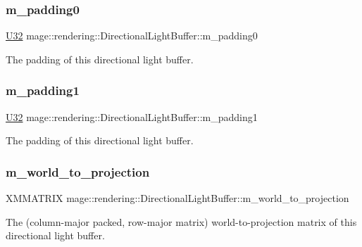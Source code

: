 \subsubsection{\texorpdfstring{m\+\_\+padding0}{m\_padding0}}
{\footnotesize\ttfamily \mbox{\hyperlink{namespacemage_aa5d6eaabaac3cdd01873d6a3d27e90f3}{U32}} mage\+::rendering\+::\+Directional\+Light\+Buffer\+::m\+\_\+padding0}

The padding of this directional light buffer. \mbox{\label{structmage_1_1rendering_1_1_directional_light_buffer_a9e86dcc4f68340eb64408cf638996a69}} 
\subsubsection{\texorpdfstring{m\+\_\+padding1}{m\_padding1}}
{\footnotesize\ttfamily \mbox{\hyperlink{namespacemage_aa5d6eaabaac3cdd01873d6a3d27e90f3}{U32}} mage\+::rendering\+::\+Directional\+Light\+Buffer\+::m\+\_\+padding1}

The padding of this directional light buffer. \mbox{\label{structmage_1_1rendering_1_1_directional_light_buffer_ae1c5a43c5dca80be889661a54fb3910b}} 
\subsubsection{\texorpdfstring{m\+\_\+world\+\_\+to\+\_\+projection}{m\_world\_to\_projection}}
{\footnotesize\ttfamily X\+M\+M\+A\+T\+R\+IX mage\+::rendering\+::\+Directional\+Light\+Buffer\+::m\+\_\+world\+\_\+to\+\_\+projection}

The (column-\/major packed, row-\/major matrix) world-\/to-\/projection matrix of this directional light buffer. 